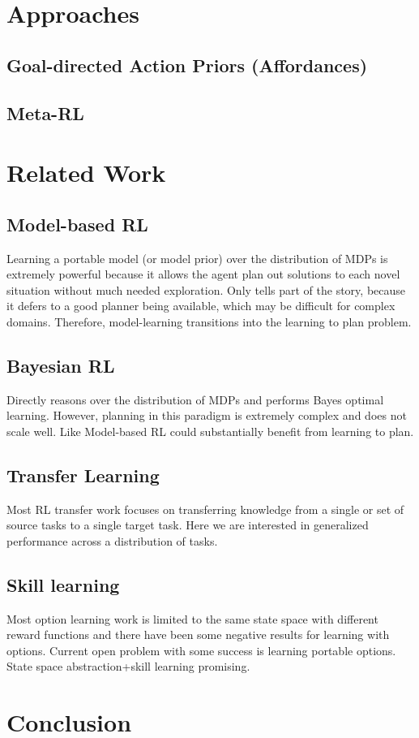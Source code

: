 \section{Approaches}
\subsection{Goal-directed Action Priors (Affordances)}
\subsection{Meta-RL}

\section{Related Work}
\subsection{Model-based RL}
Learning a portable model (or model prior) over the distribution of MDPs is extremely powerful because it allows the agent plan out solutions to each novel situation without much needed exploration. Only tells part of the story, because it defers to a good planner being available, which may be difficult for complex domains. Therefore, model-learning transitions into the learning to plan problem.
\subsection{Bayesian RL}
Directly reasons over the distribution of MDPs and performs Bayes optimal learning. However, planning in this paradigm is extremely complex and does not scale well. Like Model-based RL could substantially benefit from learning to plan.
\subsection{Transfer Learning}
Most RL transfer work focuses on transferring knowledge from a single or set of source tasks to a single target task. Here we are interested in generalized performance across a distribution of tasks.
\subsection{Skill learning}
Most option learning work is limited to the same state space with different reward functions and there have been some negative results for learning with options. Current open problem with some success is learning portable options. State space abstraction+skill learning promising.


\section{Conclusion}


